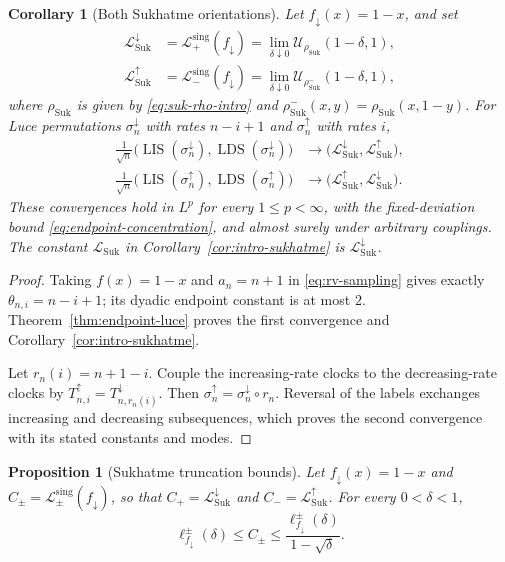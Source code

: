 \documentclass[11pt]{article}
\newtheorem{proposition}[theorem]{Proposition}
\newtheorem{corollary}[theorem]{Corollary}
\theoremstyle{remark}
\newcommand{\LIS}{\operatorname{LIS}}
\newcommand{\LDS}{\operatorname{LDS}}
\newcommand{\calL}{\mathcal L}
\newcommand{\calU}{\mathcal U}
\begin{document}
\begin{corollary}[Both Sukhatme orientations]
\label{cor:sukhatme-orientations}
Let $f_\downarrow(x)=1-x$, and set
\begin{align}
 \calL_{\mathrm{Suk}}^\downarrow
 &=\calL_+^{\mathrm{sing}}(f_\downarrow)
   =\lim_{\delta\downarrow0}
      \calU_{\rho_{\mathrm{Suk}}}(1-\delta,1),
 \label{eq:sukhatme-down-constant}\\
 \calL_{\mathrm{Suk}}^\uparrow
 &=\calL_-^{\mathrm{sing}}(f_\downarrow)
   =\lim_{\delta\downarrow0}
      \calU_{\rho_{\mathrm{Suk}}^-}(1-\delta,1),
 \label{eq:sukhatme-up-constant}
\end{align}
where $\rho_{\mathrm{Suk}}$ is given by
\eqref{eq:suk-rho-intro} and
$\rho_{\mathrm{Suk}}^-(x,y)=\rho_{\mathrm{Suk}}(x,1-y)$.
For Luce permutations $\sigma_n^\downarrow$ with rates $n-i+1$ and
$\sigma_n^\uparrow$ with rates $i$,
\begin{align*}
 \frac1{\sqrt n}
 \bigl(\LIS(\sigma_n^\downarrow),\LDS(\sigma_n^\downarrow)\bigr)
 &\longrightarrow
 \bigl(\calL_{\mathrm{Suk}}^\downarrow,
       \calL_{\mathrm{Suk}}^\uparrow\bigr),\\
 \frac1{\sqrt n}
 \bigl(\LIS(\sigma_n^\uparrow),\LDS(\sigma_n^\uparrow)\bigr)
 &\longrightarrow
 \bigl(\calL_{\mathrm{Suk}}^\uparrow,
       \calL_{\mathrm{Suk}}^\downarrow\bigr).
\end{align*}
These convergences hold in $L^p$ for every $1\le p<\infty$, with the fixed-deviation
bound \eqref{eq:endpoint-concentration}, and almost surely under arbitrary
couplings.  The constant $\calL_{\mathrm{Suk}}$ in
Corollary~\ref{cor:intro-sukhatme} is
$\calL_{\mathrm{Suk}}^\downarrow$.
\end{corollary}

\begin{proof}
Taking $f(x)=1-x$ and $a_n=n+1$ in \eqref{eq:rv-sampling} gives exactly
$\theta_{n,i}=n-i+1$; its dyadic endpoint constant is at most $2$.
Theorem~\ref{thm:endpoint-luce} proves the first convergence and
Corollary~\ref{cor:intro-sukhatme}.

Let $r_n(i)=n+1-i$.  Couple the increasing-rate clocks to the decreasing-rate
clocks by $T_{n,i}^\uparrow=T_{n,r_n(i)}^\downarrow$.
Then $\sigma_n^\uparrow=\sigma_n^\downarrow\circ r_n$.
Reversal of the labels exchanges increasing and decreasing subsequences,
which proves the second convergence with its stated constants and modes.
\end{proof}

\begin{proposition}[Sukhatme truncation bounds]
\label{prop:sukhatme-truncation}
Let $f_\downarrow(x)=1-x$ and
$C_\pm=\calL_\pm^{\mathrm{sing}}(f_\downarrow)$, so that
$C_+=\calL_{\mathrm{Suk}}^\downarrow$ and
$C_-=\calL_{\mathrm{Suk}}^\uparrow$.
For every $0<\delta<1$,
\begin{equation}\label{eq:sukhatme-selfsimilar-bound}
 \ell_{f_\downarrow}^{\pm}(\delta)
 \le C_\pm
 \le\frac{\ell_{f_\downarrow}^{\pm}(\delta)}{1-\sqrt\delta}.
\end{equation}
\end{proposition}
\end{document}
